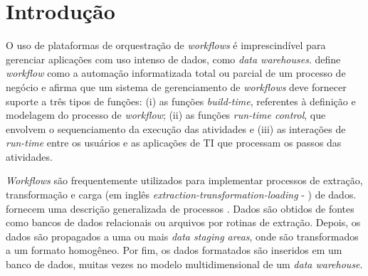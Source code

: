 \documentclass[
	12pt,				%
	oneside,			%
	a4paper,			%
	chapter=TITLE,		%
	section=TITLE,		%
	english,			%
	brazil				%
	]{abntex2}
\begin{document}
{%
	\hypersetup{hidelinks}
	\listoffigures*
	\cleardoublepage
	
	
	\listoftables*
	\cleardoublepage
	
	\imprimirlistadesiglas
	
	
	\tableofcontents*
	\cleardoublepage
	
}%

\textual

\chapter{Introdução}

O uso de plataformas de orquestração de \textit{workflows} é imprescindível para gerenciar aplicações com uso intenso de dados, como \textit{data warehouses}. \cite{hollingsworth1995workflow} define \textit{workflow} como a automação informatizada total ou parcial de um processo de negócio e afirma que um sistema de gerenciamento de \textit{workflows} deve fornecer suporte a três tipos de funções: (i) as funções \textit{build-time}, referentes à definição e modelagem do processo de \textit{workflow}; (ii) as funções \textit{run-time control}, que envolvem o sequenciamento da execução das atividades e (iii) as interações de \textit{run-time} entre os usuários e as aplicações de TI que processam os passos das atividades.

\textit{Workflows} são frequentemente utilizados para implementar processos de extração, transformação e carga (em inglês \textit{extraction-transformation-loading} - ) de dados. \cite{vassiliadis2002conceptual} fornecem uma descrição generalizada de processos . Dados são obtidos de fontes como bancos de dados relacionais ou arquivos por rotinas de extração. Depois, os dados são propagados a uma ou mais \textit{data staging areas}, onde são transformados a um formato homogêneo. Por fim, os dados formatados são inseridos em um banco de dados, muitas vezes no modelo multidimensional de um \textit{data warehouse}.
\end{document}
